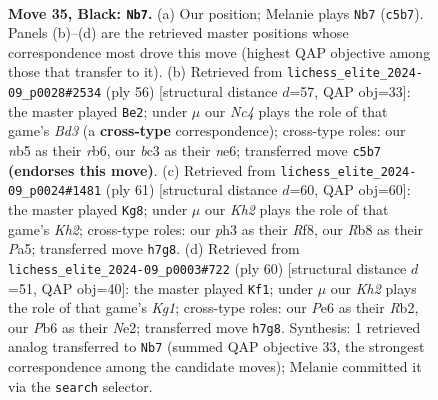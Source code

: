 \documentclass[11pt]{article}
\begin{document}
\clearpage

\begin{figure}[p]\centering
\begin{subfigure}{0.46\textwidth}\centering
\resizebox{\linewidth}{!}{%
\newchessgame
\chessboard[
  setfen={1rr5/p4p1k/1p2p1pp/1Nn5/2P5/2B1P2P/PR3PP1/5K1R b - - 0 35},
  showmover=false,
  pgfstyle=straightmove, color=movearrow, markmove={c5-b7}
]}
\caption{}
\end{subfigure}\hfill
\begin{subfigure}{0.46\textwidth}\centering
\resizebox{\linewidth}{!}{%
\newchessgame
\chessboard[
  setfen={3r2k1/1p1b1pp1/1r2np2/5N1p/1P6/2PBP2P/3R2P1/2R3K1 w - - 1 29},
  showmover=false,
  pgfstyle=straightmove, color=movearrow, markmove={d3-e2}
]}
\caption{}
\end{subfigure}
\\[4pt]
\begin{subfigure}{0.46\textwidth}\centering
\resizebox{\linewidth}{!}{%
\newchessgame
\chessboard[
  setfen={2r2r2/5p1k/2n1p1pp/pp2P3/3P1N2/2P2R2/1P4PP/1K3R2 b - - 1 31},
  showmover=false,
  pgfstyle=straightmove, color=movearrow, markmove={h7-g8}
]}
\caption{}
\end{subfigure}\hfill
\begin{subfigure}{0.46\textwidth}\centering
\resizebox{\linewidth}{!}{%
\newchessgame
\chessboard[
  setfen={r3r1k1/1R3pp1/2p1n2p/p1Pp4/P2P4/7P/1R2NPP1/6K1 w - - 2 31},
  showmover=false,
  pgfstyle=straightmove, color=movearrow, markmove={g1-f1}
]}
\caption{}
\end{subfigure}
\caption{\textbf{Move 35, Black: \texttt{Nb7}.} (a) Our position; Melanie plays \texttt{Nb7} (\texttt{c5b7}). Panels (b)--(d) are the retrieved master positions whose correspondence most drove this move (highest QAP objective among those that transfer to it). (b) Retrieved from \texttt{lichess\_elite\_2024-09\_p0028\#2534} (ply 56) [structural distance $d$=57, QAP obj=33]: the master played \texttt{Be2}; under $\mu$ our \emph{Nc4} plays the role of that game's \emph{Bd3} (a \textbf{cross-type} correspondence); cross-type roles: our \emph{n}b5 as their \emph{r}b6, our \emph{b}c3 as their \emph{n}e6; transferred move \texttt{c5b7} \textbf{(endorses this move)}. (c) Retrieved from \texttt{lichess\_elite\_2024-09\_p0024\#1481} (ply 61) [structural distance $d$=60, QAP obj=60]: the master played \texttt{Kg8}; under $\mu$ our \emph{Kh2} plays the role of that game's \emph{Kh2}; cross-type roles: our \emph{p}h3 as their \emph{R}f8, our \emph{R}b8 as their \emph{P}a5; transferred move \texttt{h7g8}. (d) Retrieved from \texttt{lichess\_elite\_2024-09\_p0003\#722} (ply 60) [structural distance $d$=51, QAP obj=40]: the master played \texttt{Kf1}; under $\mu$ our \emph{Kh2} plays the role of that game's \emph{Kg1}; cross-type roles: our \emph{P}e6 as their \emph{R}b2, our \emph{P}b6 as their \emph{N}e2; transferred move \texttt{h7g8}. Synthesis: 1 retrieved analog transferred to \texttt{Nb7} (summed QAP objective 33, the strongest correspondence among the candidate moves); Melanie committed it via the \texttt{search} selector.}
\label{fig:thought-m69}
\end{figure}
\end{document}
